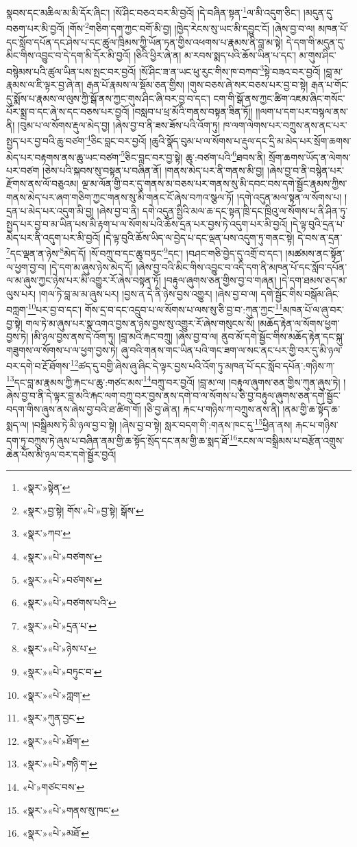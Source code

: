 སྣབས་དང་མཆིལ་མ་མི་དོར་ཞིང་། །སོ་ཤིང་བཅའ་བར་མི་བྱའོ། །དེ་བཞིན་སྟན་\footnote{«སྣར་»སྟེན་}ལ་མི་འདུག་ཅིང་། །མདུན་དུ་བཅག་པར་མི་བྱའོ། །གོས་\footnote{«སྣར་»བྱ་སྟེ། གོས་«པེ་»བྱ་སྟེ། སྒོས་}གཅིག་དག་ཀྱང་བགོ་མི་བྱ། །ཁྱེད་རེངས་སུ་ཡང་མི་དབྱུང་ངོ། །ཞེས་བྱ་བ་ལ། མཁན་པོ་དང་སློབ་དཔོན་དང་ཤེས་པ་དང་ཚུལ་ཁྲིམས་ཀྱི་ཡོན་ཏན་གྱིས་འཕགས་པ་རྣམས་ནི་བླ་མ་སྟེ། དེ་དག་གི་མདུན་དུ་མིང་གིས་འབྱུང་བ་དེ་དག་མི་དོར་མི་བྱའོ། །ཅིའི་ཕྱིར་ཞེ་ན། མ་རབས་སྨད་པའི་ཆོས་ཡིན་པ་དང་། མ་གུས་ཤིང་བསྙེམས་པའི་ཚུལ་ཡིན་པས་སྤང་བར་བྱའོ། །སོ་ཤིང་ཟ་ན་ཡང་ཕུ་རུང་གིས་ཁ་བཀབ་\footnote{«སྣར་»ཀབ་}སྟེ་བཟའ་བར་བྱའོ། །བླ་མ་རྣམས་ལ་ཇི་ལྟར་བྱ་ཞེ་ན། རྒན་པོ་རྣམས་ལ་སྡོམ་ཅན་གྱིས། །གུས་བཅས་ཞེ་སར་བཅས་པར་བྱ་བ་སྟེ། རྒན་པ་གོང་དུ་སྨོས་པ་རྣམས་ལ་ལུས་ཀྱི་སྒོ་ནས་ཀྱང་གུས་ཤིང་ཞི་བར་བྱ་བ་དང་། ངག་གི་སྒོ་ནས་ཀྱང་ཚིག་འཇམ་ཞིང་གསོང་པོར་སྨྲ་བ་དང་ཞེ་ས་དང་བཅས་པར་བྱའོ། །བསླབ་པ་ཕྲ་མོའི་གནས་བསྟན་ཟིན་ཏོ།། །།ལག་པ་དག་པར་བསྙལ་ནས་ནི། །བུམ་པ་ལ་སོགས་རྡུལ་མེད་བྱ། །ཞེས་བྱ་བ་ནི་ཟས་ཟོས་པའི་འོག་ཏུ། ཁ་ལག་ལེགས་པར་བཀྲུས་ནས་ནང་པར་སྤྱད་པར་བྱ་བའི་ཆུ་བཙག་\footnote{«སྣར་»«པེ་»བཙགས་}ཅིང་བླང་བར་བྱའོ། །ཆུའི་སྣོད་བུམ་པ་ལ་སོགས་པ་རྡུལ་དང་དྲི་མ་མེད་པར་སྲོག་ཆགས་མེད་པར་བརྟགས་ནས་ཆུ་ཡང་བཙག་\footnote{«སྣར་»«པེ་»བཙགས་}ཅིང་བླང་བར་བྱ་སྟེ། ཆུ་:བཙག་པའི་\footnote{«སྣར་»«པེ་»བཙགས་པའི་}ཐབས་ནི། སྲོག་ཆགས་ཡོད་ན་ལེགས་པར་བཙག །ཅེས་པའི་སྐབས་སུ་བསྟན་པ་བཞིན་ནོ། །གནས་མེད་པར་ནི་གནས་མི་བྱ། །ཞེས་བྱ་བ་ནི་བསྙེན་པར་རྫོགས་ནས་ལོ་བཅུའམ། ལྔ་མ་ལོན་གྱི་བར་དུ་གནས་མ་བཅས་པར་གནས་སུ་མི་དབང་བས་དགེ་སྦྱོང་རྣམས་ཀྱིས་གནས་མེད་པར་ཞག་གཅིག་ཀྱང་གནས་སུ་མི་གནང་ངོ་ཞེས་བཀའ་སྩལ་ཏོ། །དགེ་འདུན་མལ་སྟན་ལ་སོགས་པ། །དྲན་པ་མེད་པར་འདུག་མི་བྱ། །ཞེས་བྱ་བ་ནི། དགེ་འདུན་སྤྱིའི་མལ་ཆ་དང་སྟན་ཁྲི་དང་ཁྲིའུ་ལ་སོགས་པ་ནི་ཤིན་ཏུ་སྤྱད་པར་བྱ་བ་མ་ཡིན་པས་མི་རྟག་པ་ལ་སོགས་པའི་ཆོས་དྲན་པར་བྱས་ཏེ་འདུག་པར་མི་བྱའོ། །དེ་ལྟ་བུའི་དྲན་པ་མེད་པར་ནི་འདུག་པར་མི་བྱའོ། །དེ་ལྟ་བུའི་ཆོས་ཡིད་ལ་བྱེད་པ་དང་ལྡན་པས་འདུག་ཏུ་གནང་སྟེ། དེ་བས་ན་དྲན་\footnote{«སྣར་»«པེ་»དྲན་པ་}དང་ལྡན་ན་ཉེས་\footnote{«སྣར་»«པེ་»ཉེས་པ་}མེད་དོ། །སོ་བཀྲུ་བ་དང་ཆུ་བཏུང་\footnote{«སྣར་»«པེ་»བཏུང་བ་}དང་། །བཤང་གཅི་བྱེད་དུ་འགྲོ་བ་དང་། །མཚམས་ནང་སྟོན་ལ་ཕྱག་བྱ་བ། །དེ་དག་མ་ཞུས་ཉེས་མེད་དོ། །ཞེས་བྱ་བའི་མིང་གིས་འབྱུང་བ་འདི་དག་ནི་མཁན་པོ་དང་སློབ་དཔོན་ལ་མ་ཞུས་ཀྱང་ཉེས་པར་མི་འགྱུར་རོ་ཞེས་བསྟན་ཏོ། །བརྟུལ་ཞུགས་ཅན་གྱིས་བྱ་བ་གཞན། །དེ་དག་ཐམས་ཅད་མ་ལུས་པར། །གལ་ཏེ་བླ་མ་མ་ཞུས་པར། །བྱས་ན་དེ་ནི་ཉེས་བྱས་འགྱུར། །ཞེས་བྱ་བ་ལ། དགེ་སྦྱོང་གིས་བསྒོམ་ཞིང་བཀླག་\footnote{«སྣར་»«པེ་»ཀླག་}པར་བྱ་བ་དང་། གོས་དྲ་བ་དང་འདྲུབ་པ་ལ་སོགས་པ་ལས་སུ་ཅི་བྱ་བ་:ཀུན་ཀྱང་\footnote{«སྣར་»ཀུན་བྱང་}མཁན་པོ་ལ་ཞུ་བར་བྱ་སྟེ། གལ་ཏེ་མ་ཞུས་པར་སྣ་འགའ་བྱས་ན་ཉེས་བྱས་སུ་འགྱུར་རོ་ཞེས་གསུངས་སོ། །མཆོད་རྟེན་ལ་སོགས་ཕྱག་བྱས་ཏེ། །མི་ཉལ་བྱས་ནས་དེ་འོག་ཏུ། །བླ་མའི་རྐང་བཀྲུ། །ཞེས་བྱ་བ་ལ། ནུབ་མོ་དགེ་སྦྱོང་གིས་མཆོད་རྟེན་དང་སྐུ་གཟུགས་ལ་སོགས་པ་ལ་ཕྱག་བྱས་ཏེ། ཞུ་བའི་གནས་གང་ཡིན་པའི་གང་ཟག་ལ་སང་ནང་པར་གྱི་བར་དུ་མི་ཉལ་བར་དགེ་བ་རྔོ་ཐོགས་\footnote{«སྣར་»«པེ་»ཐོག་}ཚད་དུ་བགྱི་ཞེས་ཞུ་ཞིང་དེ་ལྟར་བྱས་པའི་འོག་ཏུ་མཁན་པོ་དང་སློབ་དཔོན་:གཉིས་ཀ་\footnote{«སྣར་»«པེ་»གཉི་ག་}དང་བླ་མ་རྣམས་ཀྱི་རྐང་པ་ཆུ་:གཙང་མས་\footnote{«པེ་»གཙང་བས་}བཀྲུ་བར་བྱའོ། །བླ་མ་ལ། །བརྟུལ་ཞུགས་ཅན་གྱིས་ཀུན་ཞུས་ཏེ། །ཞེས་བྱ་བ་ནི་དེ་ལྟར་བླ་མའི་རྐང་ལག་བཀྲུ་བར་བྱས་ནས་དགེ་བ་ལ་སོགས་པ་ཅི་བྱ་བརྟུལ་ཞུགས་ཅན་དགེ་སྦྱོང་བདག་གིས་ཞུས་ནས་ཞེས་བྱ་བའི་ཐ་ཚིག་གོ། །ཅི་བྱ་ཞེ་ན། རྐང་པ་གཉིས་ཀ་བཀྲུས་ནས་ནི། །ནམ་གྱི་ཆ་སྟོད་ཆ་སྨད་ལ། །བསྒྲིམས་ཏེ་མི་ཉལ་བྱ་བ་སྟེ། །ཞེས་བྱ་བ་སྟེ། སླར་བདག་གི་:གནས་ཁང་དུ་\footnote{«སྣར་»«པེ་»གནས་སུ་ཁང་}ཕྱིན་ནས། རྐང་པ་གཉིས་དག་ཏུ་བཀྲུས་ཏེ་ཞུས་པ་བཞིན་ནམ་གྱི་ཆ་སྟོད་སྲོད་དང་ནམ་གྱི་ཆ་སྨད་ཐོ་\footnote{«སྣར་»«པེ་»མཐོ་}རངས་ལ་བསྒྲིམས་པ་བརྩོན་འགྲུས་ཆེན་པོས་མི་ཉལ་བར་དགེ་སྦྱོར་བྱའོ། 